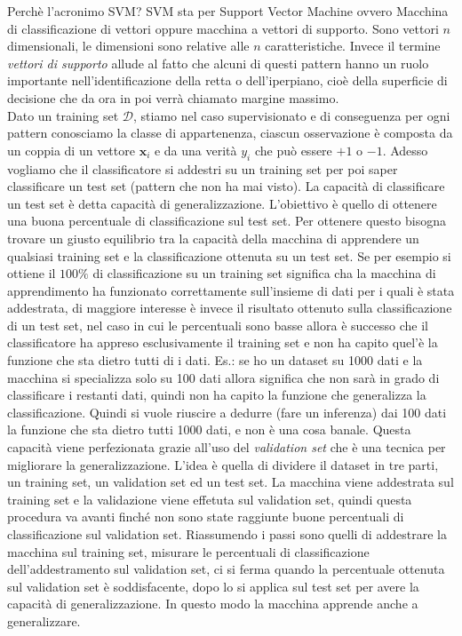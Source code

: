 \noindent Perchè l'acronimo SVM? SVM sta per Support Vector Machine ovvero Macchina di classificazione di vettori oppure macchina a vettori di supporto. Sono vettori $n$ dimensionali, le dimensioni sono relative alle $n$ caratteristiche. Invece il termine \emph{vettori di supporto} allude al fatto che alcuni di questi pattern hanno un ruolo importante nell'identificazione della retta o dell'iperpiano, cioè della superficie di decisione che da ora in poi verrà chiamato margine massimo.\\

\noindent Dato un training set $\mathcal{D}$, stiamo nel caso supervisionato e di conseguenza per ogni pattern conosciamo la classe di appartenenza, ciascun osservazione è composta da un coppia di un vettore $\mathbf{x}_i$ e da una verità $y_i$ che può essere $+1$ o $-1$. Adesso vogliamo che il classificatore si addestri su un training set per poi saper classificare un test set (pattern che non ha mai visto). La capacità di classificare un test set è detta capacità di generalizzazione. L'obiettivo è quello di ottenere una buona percentuale di classificazione sul test set. Per ottenere questo bisogna trovare un giusto equilibrio tra la capacità della macchina di apprendere un qualsiasi training set e la classificazione ottenuta su un test set. Se per esempio si ottiene il $100\%$ di classificazione su un training set significa cha la macchina di apprendimento ha funzionato correttamente sull'insieme di dati per i quali è stata addestrata, di maggiore interesse è invece il risultato ottenuto sulla classificazione di un test set, nel caso in cui le percentuali sono basse allora è successo che il classificatore ha appreso esclusivamente il training set e non ha capito quel'è la funzione che sta dietro tutti di i dati. Es.: se ho un dataset su 1000 dati e la macchina si specializza solo su 100 dati allora significa che non sarà in grado di classificare i restanti dati, quindi non ha capito la funzione che generalizza la classificazione. Quindi si vuole riuscire a dedurre (fare un inferenza) dai 100 dati la funzione che sta dietro tutti 1000 dati, e non è una cosa banale. Questa capacità viene perfezionata grazie all'uso del \emph{validation set} che è una tecnica per migliorare la generalizzazione. L'idea è quella di dividere il dataset in tre parti, un training set, un validation set ed un test set. La macchina viene addestrata sul training set e la validazione viene effetuta  sul validation set, quindi questa procedura va avanti finché non sono state raggiunte buone percentuali di classificazione sul validation set. Riassumendo i passi sono quelli di addestrare la macchina sul training set, misurare le percentuali di classificazione dell'addestramento sul validation set, ci si ferma quando la percentuale ottenuta sul validation set è soddisfacente, dopo lo si applica sul test set per avere la capacità di generalizzazione. In questo modo la macchina apprende anche a generalizzare. \\

